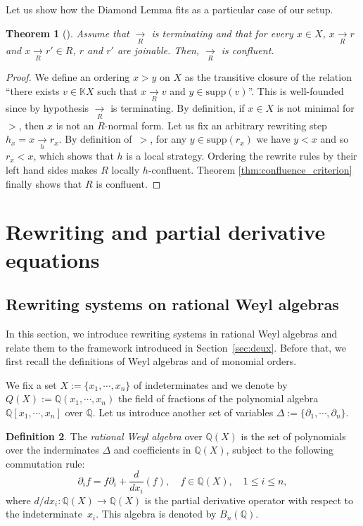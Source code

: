 \documentclass[10pt]{easychair}
\newtheorem{theorem}{Theorem}[section]
\theoremstyle{definition}
\newtheorem{definition}[theorem]{Definition}
\newcommand\secTrois{Rewriting and partial derivative equations}
\newcommand\secTroisUn{Rewriting systems on rational Weyl algebras}
\newcommand\supp{\text{supp}}
\newcommand\diff[1]{\partial_{#1}}
\newcommand\K{\mathbb{K}}
\newcommand\Q{\mathbb{Q}}
\newcommand\QX{\mathbb{Q}[x_1,\cdots,x_n]}
\newcommand\QXX{\mathbb{Q}(x_1,\cdots,x_n)}
\newcommand\KX{\K X}
\newcommand\Weyl{B_n(\Q)}
\newcommand\rewR{\underset{R}{\longrightarrow}}
\newcommand\rewh{\underset{h}{\longrightarrow}}
\begin{document}
\medskip


Let us show how the Diamond Lemma fits as a particular case of our setup.
\smallskip

\begin{theorem}[\cite{MR506890}]\label{thm:diamond_lemma}
  Assume that $\rewR$ is terminating and that for every $x\in X$, $x\rewR r$ and $x\rewR r'\in R$, $r$ and $r'$ are joinable. Then, $\rewR$ is confluent.
\end{theorem}

\begin{proof}
  We define an ordering $x > y$ on $X$ as the transitive closure of the relation ``there exists $v \in \KX$ such that $x \rewR v$ and $y\in\supp(v)$''. This is well-founded since by hypothesis $\rewR$ is terminating. By definition, if $x \in X$ is not minimal for $>$, then $x$ is not an $R$-normal form. Let us fix an arbitrary rewriting step $h_x= x \rewh r_x$.  By definition of~$>$, for any $y \in \supp(r_x)$ we have $y < x$ and so $r_x < x$, which shows that  $h$ is a local strategy. Ordering the rewrite rules by their left hand sides makes $R$ locally $h$-confluent. Theorem \ref{thm:confluence_criterion} finally shows that $R$ is confluent.  
\end{proof}

\section{\secTrois}\label{sec:trois}

\subsection{\secTroisUn}\label{sec:troisUn}

In this section, we introduce rewriting systems in rational Weyl algebras
and relate them to the framework introduced in Section~\ref{sec:deux}.
Before that, we first recall the definitions of Weyl algebras and of
monomial orders.
\medskip

We fix a set $X:=\{x_1,\cdots,x_n\}$ of indeterminates and we denote by
$Q(X):=\QXX$ the field of fractions of the polynomial algebra $\QX$ over
$\Q$. Let us introduce another set of variables
$\Delta:=\{\diff{1},\cdots,\diff{n}\}$. 

\begin{definition}
  The {\it rational Weyl algebra} over $\Q(X)$ is the set of polynomials
  over the inderminates $\Delta$ and coefficients in $\Q(X)$, subject to
  the following commutation rule:
  \[\diff{i}f=f\diff{i}+\frac{d}{dx_i}(f),\quad f\in\Q(X),\quad
  1\leq i\leq n,\]
  where $d/dx_i:\Q(X)\to\Q(X)$ is the partial derivative operator with
  respect to the indeterminate~$x_i$. This algebra is denoted by $\Weyl$.
\end{definition}
\end{document}
